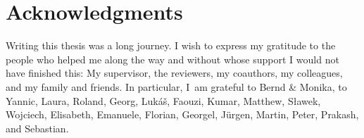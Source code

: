 \documentclass[../../diss.tex]{subfiles}
\begin{document}
\begingroup%
\let\clearpage\relax%
\let\cleardoublepage\relax%
\chapter*{Acknowledgments}%
\endgroup%

Writing this thesis was a long journey.
I wish to express my gratitude to the people who helped me along the way and without whose support I would not have finished this: My supervisor, the reviewers, my coauthors, my colleagues, and my family and friends.
In particular, I~am grateful to Bernd \& Monika,
to Yannic,
Laura,
Roland,
Georg, Lukáš,
Faouzi, Kumar, Matthew, Sławek, Wojciech,
Elisabeth, Emanuele, Florian, Georgel, Jürgen, Martin, Peter, Prakash, and Sebastian.
\end{document}

